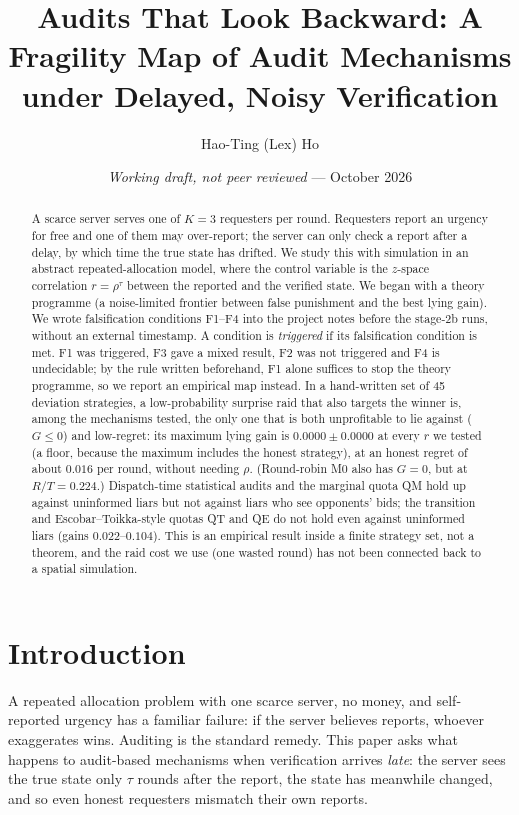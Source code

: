 \documentclass[10pt]{article}
\title{Audits That Look Backward: A Fragility Map of Audit Mechanisms\\under Delayed, Noisy Verification}
\author{Hao-Ting (Lex) Ho}
\date{\textit{Working draft, not peer reviewed} --- October 2026}
\begin{document}
\maketitle

\begin{abstract}
A scarce server serves one of $K{=}3$ requesters per round. Requesters report an urgency for free and one of them may over-report; the server can only check a report after a delay, by which time the true state has drifted. We study this with simulation in an abstract repeated-allocation model, where the control variable is the $z$-space correlation $r=\rho^\tau$ between the reported and the verified state. We began with a theory programme (a noise-limited frontier between false punishment and the best lying gain). We wrote falsification conditions F1--F4 into the project notes before the stage-2b runs, without an external timestamp. A condition is \emph{triggered} if its falsification condition is met. F1 was triggered, F3 gave a mixed result, F2 was not triggered and F4 is undecidable; by the rule written beforehand, F1 alone suffices to stop the theory programme, so we report an empirical map instead. In a hand-written set of 45 deviation strategies, a low-probability surprise raid that also targets the winner is, among the mechanisms tested, the only one that is both unprofitable to lie against ($G\le0$) and low-regret: its maximum lying gain is $0.0000\pm0.0000$ at every $r$ we tested (a floor, because the maximum includes the honest strategy), at an honest regret of about $0.016$ per round, without needing $\rho$. (Round-robin M0 also has $G=0$, but at $R/T=0.224$.) Dispatch-time statistical audits and the marginal quota QM hold up against uninformed liars but not against liars who see opponents' bids; the transition and Escobar--Toikka-style quotas QT and QE do not hold even against uninformed liars (gains $0.022$--$0.104$). This is an empirical result inside a finite strategy set, not a theorem, and the raid cost we use (one wasted round) has not been connected back to a spatial simulation.
\end{abstract}

\section{Introduction}
A repeated allocation problem with one scarce server, no money, and self-reported urgency has a familiar failure: if the server believes reports, whoever exaggerates wins. Auditing is the standard remedy. This paper asks what happens to audit-based mechanisms when verification arrives \emph{late}: the server sees the true state only $\tau$ rounds after the report, the state has meanwhile changed, and so even honest requesters mismatch their own reports.
\end{document}

